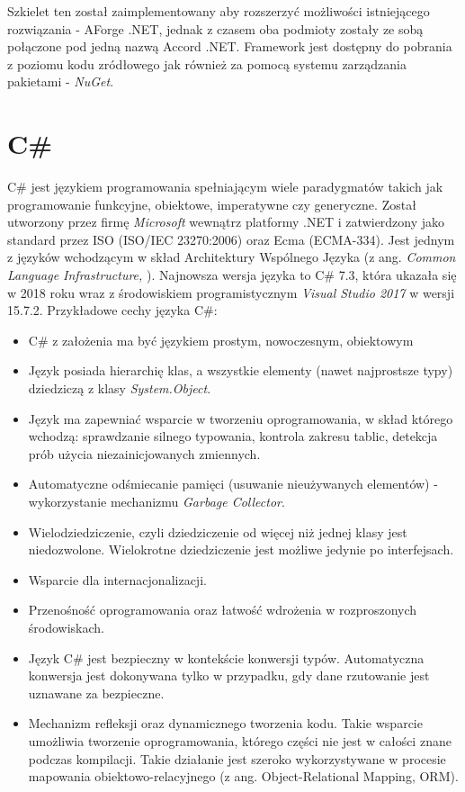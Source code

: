 Szkielet ten został zaimplementowany aby rozszerzyć możliwości istniejącego rozwiązania - AForge .NET, jednak z czasem oba podmioty zostały ze sobą połączone pod jedną nazwą Accord .NET. Framework jest dostępny do pobrania z poziomu kodu zródłowego jak również za pomocą systemu zarządzania pakietami - \textit{NuGet}.

\section{C\#}
 C\# jest językiem programowania spełniającym wiele paradygmatów takich jak programowanie funkcyjne, obiektowe, imperatywne czy generyczne. Został utworzony przez firmę \textit{Microsoft} wewnątrz platformy .NET i zatwierdzony jako standard przez ISO (ISO/IEC 23270:2006) oraz Ecma (ECMA-334). Jest jednym z języków wchodzącym w skład Architektury Wspólnego Języka (z ang. \textit{Common Language Infrastructure, }). Najnowsza wersja języka to C\# 7.3, która ukazała się w 2018 roku wraz z środowiskiem programistycznym \textit{Visual Studio 2017} w wersji 15.7.2.
 Przykładowe cechy języka C\#:
 \begin{itemize}
 	\item C\# z założenia ma być językiem prostym, nowoczesnym, obiektowym
 	\item Język posiada hierarchię klas, a wszystkie elementy (nawet najprostsze typy) dziedziczą z klasy \textit{System.Object}.
 	\item Język ma zapewniać wsparcie w tworzeniu oprogramowania, w skład którego wchodzą: sprawdzanie silnego typowania, kontrola zakresu tablic, detekcja prób użycia niezainicjowanych zmiennych.
 	\item Automatyczne odśmiecanie pamięci (usuwanie nieużywanych elementów) - wykorzystanie mechanizmu \textit{Garbage Collector}.
 	\item Wielodziedziczenie, czyli dziedziczenie od więcej niż jednej klasy jest niedozwolone. Wielokrotne dziedziczenie jest możliwe jedynie po interfejsach.
 	\item Wsparcie dla internacjonalizacji.
 	\item Przenośność oprogramowania oraz łatwość wdrożenia w rozproszonych środowiskach. 
 	\item Język C\# jest bezpieczny w kontekście konwersji typów. Automatyczna konwersja jest dokonywana tylko w przypadku, gdy dane rzutowanie jest uznawane za bezpieczne.
 	\item Mechanizm refleksji oraz dynamicznego tworzenia kodu. Takie wsparcie umożliwia tworzenie oprogramowania, którego części nie jest w całości znane podczas kompilacji.
 	Takie działanie jest szeroko wykorzystywane w procesie mapowania obiektowo-relacyjnego (z ang. Object-Relational Mapping, ORM).
 \end{itemize} 

